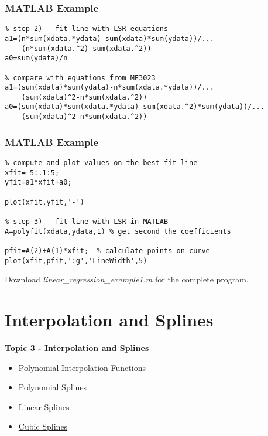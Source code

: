 \documentclass[fleqn]{beamer} %
\newcommand{\sectionIIItitle}{Interpolation and Splines}
\newcommand{\sectionIIsubsectionIVtitle}{MATLAB Example}
\newcommand{\sectionIIIsubsectionItitle}{Polynomial Interpolation Functions}
\newcommand{\sectionIIIsubsectionIItitle}{Polynomial Splines}
\newcommand{\sectionIIIsubsectionIIItitle}{Linear Splines}
\newcommand{\sectionIIIsubsectionIVtitle}{Cubic Splines}
\begin{document}
			\begin{frame}[fragile]
				\frametitle{\sectionIIsubsectionIVtitle}
				\bigskip

        \begin{lstlisting}
% step 2) - fit line with LSR equations
a1=(n*sum(xdata.*ydata)-sum(xdata)*sum(ydata))/...
    (n*sum(xdata.^2)-sum(xdata.^2))
a0=sum(ydata)/n

% compare with equations from ME3023
a1=(sum(xdata)*sum(ydata)-n*sum(xdata.*ydata))/...
    (sum(xdata)^2-n*sum(xdata.^2))
a0=(sum(xdata)*sum(xdata.*ydata)-sum(xdata.^2)*sum(ydata))/...
    (sum(xdata)^2-n*sum(xdata.^2))          
        \end{lstlisting}

				\btVFill 
			\end{frame}

			\begin{frame}[fragile]
				\frametitle{\sectionIIsubsectionIVtitle}
				\bigskip

        \begin{lstlisting}
% compute and plot values on the best fit line
xfit=-5:.1:5;
yfit=a1*xfit+a0;

plot(xfit,yfit,'-')

% step 3) - fit line with LSR in MATLAB
A=polyfit(xdata,ydata,1) % get second the coefficients

pfit=A(2)+A(1)*xfit;  % calculate points on curve
plot(xfit,pfit,':g','LineWidth',5)
        \end{lstlisting}

        Download {\it linear\_regression\_example1.m} for the complete program.
				\btVFill 
			\end{frame}

	\section{\sectionIIItitle}\label{sectionIII}

		\begin{frame}
			\large \textbf{Topic 3 - \sectionIIItitle} \vspace{3mm}\\

			\begin{itemize}
				\item \hyperlink{sectionIIIsubsectionI}{\sectionIIIsubsectionItitle} \vspc %
				\item \hyperlink{sectionIIIsubsectionII}{\sectionIIIsubsectionIItitle} \vspc %
				\item \hyperlink{sectionIIIsubsectionIII}{\sectionIIIsubsectionIIItitle} \vspc %
				\item \hyperlink{sectionIIIsubsectionIV}{\sectionIIIsubsectionIVtitle} \vspc %
			\end{itemize}

		\end{frame}
\end{document}
